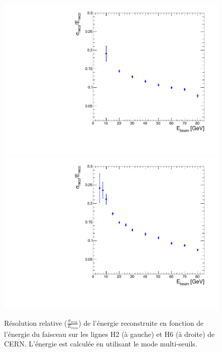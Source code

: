 \begin{figure}[!ht]
  \begin{center}
    \includegraphics[width=.49\textwidth]{SDHCAL/figs/RESO_Nov_10.pdf}
    \includegraphics[width=.49\textwidth]{SDHCAL/figs/RESO_Sept_10.pdf}
    \caption{Résolution relative ($\frac{\sigma_{reco}}{E_{reco}}$) de l'énergie reconstruite en fonction de l'énergie du faisceau sur les lignes H2 (à gauche) et H6 (à droite) de CERN. L'énergie est calculée en utilisant le mode multi-seuils.}
    \label{fig:resolution_sd}
  \end{center}
\end{figure}

